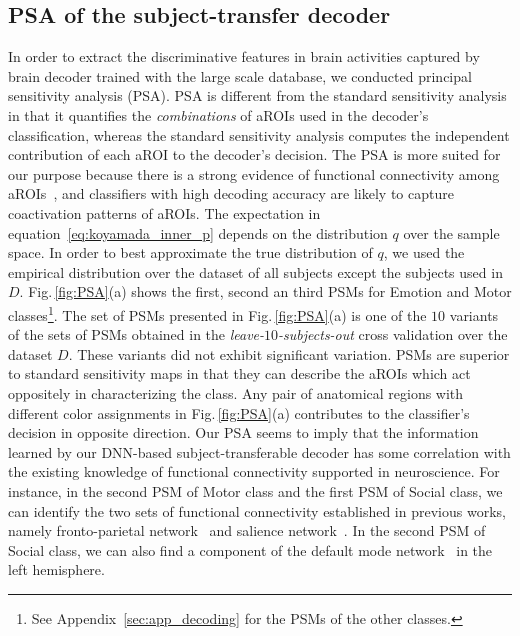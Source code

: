 \subsection{PSA of the subject-transfer decoder}
\label{PSA_of_dnn_decoder}
In order to extract the discriminative features in brain activities captured by brain decoder trained with the large scale database, we conducted principal sensitivity analysis (PSA).
%
PSA is different from the standard sensitivity analysis in that it quantifies the \textit{combinations} of aROIs used in the decoder's classification, whereas the standard sensitivity analysis computes the independent contribution of each aROI to the decoder's decision.
%
The PSA is more suited for our purpose because there is a strong evidence of functional connectivity among aROIs~\cite{Buckner2013, Cole2014}, and classifiers with high decoding accuracy are likely to capture coactivation patterns of aROIs.
The expectation in equation~\eqref{eq:koyamada_inner_p} depends on the distribution $q$ over the sample space.
%
In order to best approximate the true distribution of $q$, we used the empirical distribution over the dataset of all subjects except the subjects used in $D$.
Fig.\,\ref{fig:PSA}(a) shows the first, second an third PSMs for Emotion and Motor classes\footnote{See Appendix~\ref{sec:app_decoding} for the PSMs of the other classes.}.
%
The set of PSMs presented in Fig.\,\ref{fig:PSA}(a) is one of the $10$ variants of the sets of PSMs obtained in the \textit{leave-$10$-subjects-out} cross validation over the dataset $D$.
%
These variants did not exhibit significant variation.
%
PSMs are superior to standard sensitivity maps in that they can describe the aROIs which act oppositely in characterizing the class.
%
Any pair of anatomical regions with different color assignments in Fig.\,\ref{fig:PSA}(a) contributes to the classifier's decision in opposite direction.
%
Our PSA seems to imply that the information learned by our DNN-based subject-transferable decoder has some correlation with the existing knowledge of functional connectivity supported in neuroscience.
%
For instance,  in the second PSM of Motor class and the first PSM of Social class,
we can identify the two sets of functional connectivity established in previous works, namely fronto-parietal network~\cite{cole2013multi} and salience network~\cite{taylor2009two}.
%
In the second PSM of Social class, we can also find a component of the default mode network~\cite{raichle2007default, raichle2001default} in the left hemisphere.
